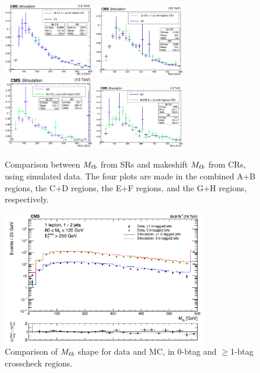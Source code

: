 \begin{figure}[htbp]
\centering
\includegraphics[width=0.35\textwidth]{figures/cr0b_Mlbshape_AB.png}
\includegraphics[width=0.35\textwidth]{figures/cr0b_Mlbshape_CD.png}
\includegraphics[width=0.35\textwidth]{figures/cr0b_Mlbshape_EF.png}
\includegraphics[width=0.35\textwidth]{figures/cr0b_Mlbshape_GH.png}
\caption{Comparison between $M_{\ell b}$ from SRs and makeshift $M_{\ell b}$
   from CRs, using simulated data. The four plots are made in the
  combined A+B regions, the C+D regions, the E+F regions, and the G+H
  regions, respectively.}
\label{fig:stop:1lw:mlb}
\end{figure}

\begin{figure}[htbp]
\centering
\includegraphics[width=0.8\textwidth]{figures/cr0b_Mlbshape_crosscheck.pdf}
\caption{Comparison of $M_{\ell b}$ shape for data and MC, in 0-btag
  and $\geq$1-btag crosscheck regions.}
\label{fig:stop:1lw:mlbxcheck}
\end{figure}

